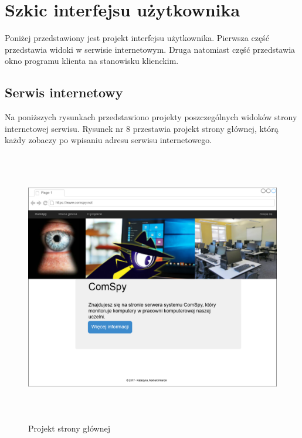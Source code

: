 \section{Szkic interfejsu użytkownika}

Poniżej przedstawiony jest projekt interfejsu użytkownika. Pierwsza część przedstawia widoki w serwisie internetowym. Druga natomiast część przedstawia okno programu klienta na stanowisku klienckim. 

\subsection{Serwis internetowy}
Na poniższych rysunkach przedstawiono projekty poszczególnych widoków strony internetowej serwisu. Rysunek nr 8 przestawia projekt strony głównej, którą każdy zobaczy po wpisaniu adresu serwisu internetowego.
\begin{figure} [!ht]
    \centering
    \includegraphics[height=12cm,width=15cm]{interfejs_homepage}
    \caption{Projekt strony głównej}
    \label{fig:my_label}
\end{figure}

